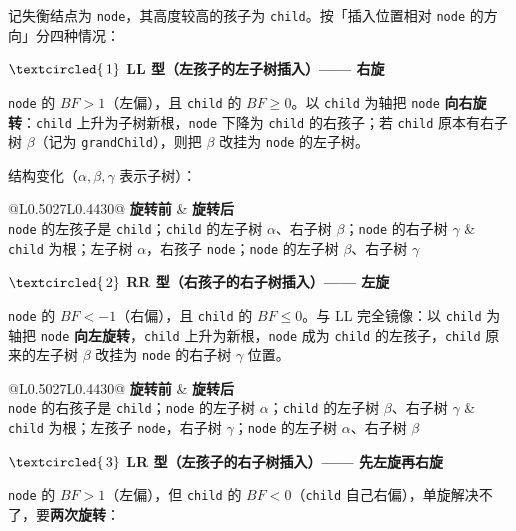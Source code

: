 \documentclass[11pt,openany,UTF8]{ctexbook}
\newcommand{\circled}[1]{\textcircled{\scriptsize\,#1}}
\begin{document}
记失衡结点为 \texttt{node}，其高度较高的孩子为 \texttt{child}。按「插入位置相对 \texttt{node} 的方向」分四种情况：

\textbf{$\circled{1}$ LL 型（左孩子的左子树插入）—— 右旋}

\texttt{node} 的 $BF>1$（左偏），且 \texttt{child} 的 $BF\ge 0$。以 \texttt{child} 为轴把 \texttt{node} \textbf{向右旋转}：\texttt{child} 上升为子树新根，\texttt{node} 下降为 \texttt{child} 的右孩子；若 \texttt{child} 原本有右子树 $\beta$（记为 \texttt{grandChild}），则把 $\beta$ 改挂为 \texttt{node} 的左子树。

结构变化（$\alpha,\beta,\gamma$ 表示子树）：

\begingroup\small\setlength{\tabcolsep}{4.0pt}
\begin{longtable}{@{}L{0.5027\linewidth}L{0.4430\linewidth}@{}}
\toprule
\textbf{旋转前} & \textbf{旋转后} \\
\midrule
\endhead
\texttt{node} 的左孩子是 \texttt{child}；\texttt{child} 的左子树 $\alpha$、右子树 $\beta$；\texttt{node} 的右子树 $\gamma$ & \texttt{child} 为根；左子树 $\alpha$，右孩子 \texttt{node}；\texttt{node} 的左子树 $\beta$、右子树 $\gamma$ \\
\bottomrule
\end{longtable}
\endgroup

\textbf{$\circled{2}$ RR 型（右孩子的右子树插入）—— 左旋}

\texttt{node} 的 $BF<-1$（右偏），且 \texttt{child} 的 $BF\le 0$。与 LL 完全镜像：以 \texttt{child} 为轴把 \texttt{node} \textbf{向左旋转}，\texttt{child} 上升为新根，\texttt{node} 成为 \texttt{child} 的左孩子，\texttt{child} 原来的左子树 $\beta$ 改挂为 \texttt{node} 的右子树 $\gamma$ 位置。

\begingroup\small\setlength{\tabcolsep}{4.0pt}
\begin{longtable}{@{}L{0.5027\linewidth}L{0.4430\linewidth}@{}}
\toprule
\textbf{旋转前} & \textbf{旋转后} \\
\midrule
\endhead
\texttt{node} 的右孩子是 \texttt{child}；\texttt{node} 的左子树 $\alpha$；\texttt{child} 的左子树 $\beta$、右子树 $\gamma$ & \texttt{child} 为根；左孩子 \texttt{node}，右子树 $\gamma$；\texttt{node} 的左子树 $\alpha$、右子树 $\beta$ \\
\bottomrule
\end{longtable}
\endgroup

\textbf{$\circled{3}$ LR 型（左孩子的右子树插入）—— 先左旋再右旋}

\texttt{node} 的 $BF>1$（左偏），但 \texttt{child} 的 $BF<0$（\texttt{child} 自己右偏），单旋解决不了，要\textbf{两次旋转}：
\end{document}
